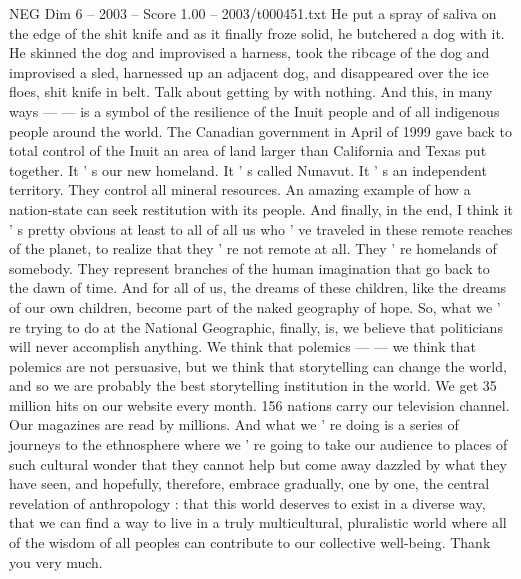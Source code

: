 \begin{textsample}{NEG Dim 6 – 2003 – Score 1.00 – 2003/t000451.txt}
He put a spray of saliva on the edge of the shit knife and as it finally froze solid, he butchered a dog with it.
He skinned the dog and improvised a harness, took the ribcage of the dog and improvised a sled, harnessed up an adjacent dog, and disappeared over the ice floes, shit knife in belt.
Talk about getting by with nothing.
And this, in many ways — — is a symbol of the resilience of the Inuit people and of all indigenous people around the world.
The Canadian government in April of 1999 gave back to total control of the Inuit an area of land larger than California and Texas put together.
It ' s our new homeland.
It ' s called Nunavut.
It ' s an independent territory.
They control all mineral resources.
An amazing example of how a nation-state can seek restitution with its people.
And finally, in the end, I think it ' s pretty obvious at least to all of all us who ' ve traveled in these remote reaches of the planet, to realize that they ' re not remote at all.
They ' re homelands of somebody.
They represent branches of the human imagination that go back to the dawn of time.
And for all of us, the dreams of these children, like the dreams of our own children, become part of the naked geography of hope.
So, what we ' re trying to do at the National Geographic, finally, is, we believe that politicians will never accomplish anything.
We think that polemics — — we think that polemics are not persuasive, but we think that storytelling can change the world, and so we are probably the best storytelling institution in the world.
We get 35 million hits on our website every month. 156 nations carry our television channel.
Our magazines are read by millions.
And what we ' re doing is a series of journeys to the ethnosphere where we ' re going to take our audience to places of such cultural wonder that they cannot help but come away dazzled by what they have seen, and hopefully, therefore, embrace gradually, one by one, the central revelation of anthropology : that this world deserves to exist in a diverse way, that we can find a way to live in a truly multicultural, pluralistic world where all of the wisdom of all peoples can contribute to our collective well-being.
Thank you very much.

\end{textsample}
